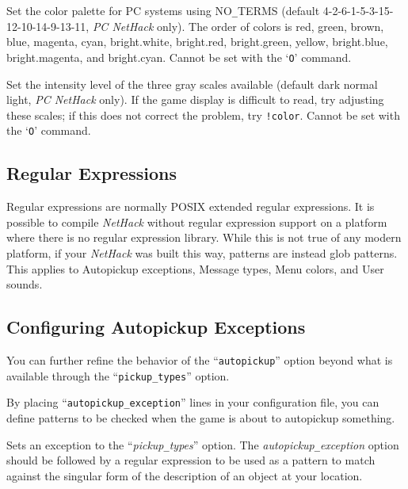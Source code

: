 \begin{sloppypar}
Set the color palette for PC systems using NO\verb+_+TERMS
(default 4-2-6-1-5-3-15-12-10-14-9-13-11, {\it PC\/ NetHack\/} only).
The order of colors is red, green, brown, blue, magenta, cyan,
bright.white, bright.red, bright.green, yellow, bright.blue,
bright.magenta, and bright.cyan.
Cannot be set with the `{\tt O}' command.
\end{sloppypar}
\item[\ib{videoshades}]
Set the intensity level of the three gray scales available
(default dark normal light, {\it PC\/ NetHack\/} only).
If the game display is difficult to read, try adjusting these scales;
if this does not correct the problem, try {\tt !color}.
Cannot be set with the `{\tt O}' command.
\elist

\subsection*{Regular Expressions}

Regular expressions are normally POSIX extended regular expressions. It is
possible to compile {\it NetHack\/} without regular expression support on
a platform where
there is no regular expression library. While this is not true of any modern
platform, if your {\it NetHack\/} was built this way, patterns are instead glob
patterns. This applies to Autopickup exceptions, Message types, Menu colors,
and User sounds.

\subsection*{Configuring Autopickup Exceptions}

You can further refine the behavior of the ``{\tt autopickup}'' option
beyond what is available through the ``{\tt pickup\verb+_+types}'' option.

By placing ``{\tt autopickup\verb+_+exception}'' lines in your configuration
file, you can define patterns to be checked when the game is about to
autopickup something.

\blist{}
\item[\ib{autopickup\verb+_+exception}]
Sets an exception to the ``{\it pickup\verb+_+types}'' option.
The {\it autopickup\verb+_+exception\/} option should be followed by a regular
expression to be used as a pattern to match against the singular form of the
description of an object at your location.

